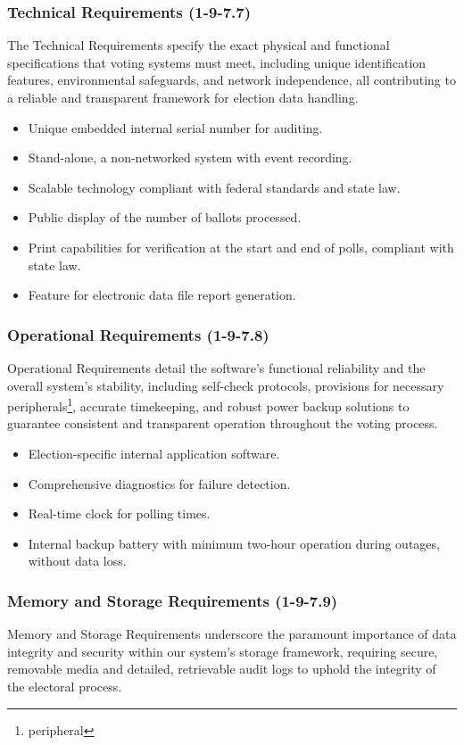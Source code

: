 \documentclass{article}
\begin{document}
\subsubsection{Technical Requirements (1-9-7.7)}
The Technical Requirements specify the exact physical and functional specifications that voting systems must meet, including unique identification features, environmental safeguards, and network independence, all contributing to a reliable and transparent framework for election data handling.

\begin{itemize}
    \item Unique embedded internal serial number for auditing.
    \item Stand-alone, a non-networked system with event recording.
    \item Scalable technology compliant with federal standards and state law.
    \item Public display of the number of ballots processed.
    \item Print capabilities for verification at the start and end of polls, compliant with state law.
    \item Feature for electronic data file report generation.
\end{itemize}

\subsubsection{Operational Requirements (1-9-7.8)}
Operational Requirements detail the software's functional reliability and the overall system's stability, including self-check protocols, provisions for necessary \glspl{peripheral}\footnote{\glsdesc{peripheral}}, accurate timekeeping, and robust power backup solutions to guarantee consistent and transparent operation throughout the voting process.

\begin{itemize}
    \item Election-specific internal application software.
    \item Comprehensive diagnostics for failure detection.
    \item Real-time clock for polling times.
    \item Internal backup battery with minimum two-hour operation during outages, without data loss.
\end{itemize}

\subsubsection{Memory and Storage Requirements (1-9-7.9)}
Memory and Storage Requirements underscore the paramount importance of data integrity and security within our system's storage framework, requiring secure, removable media and detailed, retrievable audit logs to uphold the integrity of the electoral process.
\end{document}
